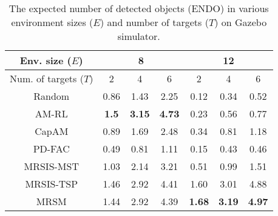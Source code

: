 \begin{table}[]
\centering
\caption{The expected number of detected objects (ENDO) in various environment sizes ($E$) and number of targets ($T$) on Gazebo simulator.}
\label{tab:ANDO}
\begin{tabular}{|c|ccc|ccc|}
\hline
Env. size ($E$) &
  \multicolumn{3}{c|}{8} &
  \multicolumn{3}{c|}{12} \\ \hline
Num. of targets ($T$) &
  \multicolumn{1}{c|}{2} &
  \multicolumn{1}{c|}{4} &
  6 &
  \multicolumn{1}{c|}{2} &
  \multicolumn{1}{c|}{4} &
  6 \\ \hline\hline
Random &
  \multicolumn{1}{c|}{0.86} &
  \multicolumn{1}{c|}{1.43} &
  2.25 &
  \multicolumn{1}{c|}{0.12} &
  \multicolumn{1}{c|}{0.34} &
  0.52 \\ \hline
AM-RL\cite{kool2018attention} &
  \multicolumn{1}{c|}{\textbf{1.5}} &
  \multicolumn{1}{c|}{\textbf{3.15}} &
  \textbf{4.73} &
  \multicolumn{1}{c|}{0.23} &
  \multicolumn{1}{c|}{0.56} &
  0.77 \\ \hline
CapAM\cite{paull2022learning} &
  \multicolumn{1}{c|}{0.89} &
  \multicolumn{1}{c|}{1.69} &
  2.48 &
  \multicolumn{1}{c|}{0.34} &
  \multicolumn{1}{c|}{0.81} &
  1.18 \\ \hline
PD-FAC\cite{sheng2022pd} &
  \multicolumn{1}{c|}{0.49} &
  \multicolumn{1}{c|}{0.81} &
  1.11 &
  \multicolumn{1}{c|}{0.15} &
  \multicolumn{1}{c|}{0.43} &
  0.46 \\ \hline
MRSIS-MST\cite{li2024mrsis} &
  \multicolumn{1}{c|}{1.03} &
  \multicolumn{1}{c|}{2.14} &
  3.21 &
  \multicolumn{1}{c|}{0.51} &
  \multicolumn{1}{c|}{0.99} &
  1.51 \\ \hline
MRSIS-TSP\cite{li2024mrsis} &
  \multicolumn{1}{c|}{1.46} &
  \multicolumn{1}{c|}{2.92} &
  4.41 &
  \multicolumn{1}{c|}{1.60} &
  \multicolumn{1}{c|}{3.01} &
  4.88 \\ \hline
MRSM &
  \multicolumn{1}{c|}{1.44} &
  \multicolumn{1}{c|}{2.92} &
  4.39 &
  \multicolumn{1}{c|}{\textbf{1.68}} &
  \multicolumn{1}{c|}{\textbf{3.19}} &
  \textbf{4.97} \\ \hline
\end{tabular}
\end{table}


